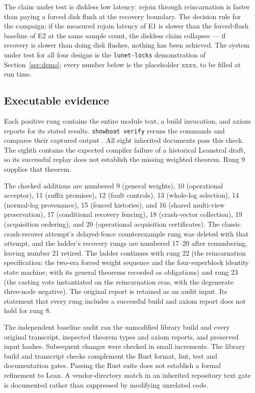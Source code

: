 \documentclass[10pt,journal,letterpaper]{IEEEtran}
\newcommand{\code}[1]{\texttt{\small #1}}
\begin{document}
The claim under test is diskless low latency: rejoin through reincarnation
is faster than paying a forced disk flush at the recovery boundary. The
decision rule for the campaign: if the measured rejoin latency of E1 is
slower than the forced-flush baseline of E2 at the same sample count, the
diskless claim collapses --- if recovery is slower than doing disk flushes,
nothing has been achieved. The system under test for all four designs is the
\code{lunet-locks} demonstration of Section~\ref{sec:demo}; every number
below is the placeholder $\mathrm{xxxx}$, to be filled at run time.

\subsection{Executable evidence}
Each positive rung contains the entire module text, a build invocation, and
axiom reports for its stated results. \code{showboat verify} reruns the
commands and compares their captured output \cite{showboat}. All eight
inherited documents pass this check. The eighth contains the expected compiler
failure of a historical Leanstral draft, so its successful replay does not
establish the missing weighted theorem. Rung 9 supplies that theorem.

The checked additions are numbered 9 (general weights), 10 (operational
acceptor), 11 (suffix promises), 12 (fault controls), 13 (whole-log
selection), 14 (normal-log provenance), 15 (fenced histories), and 16
(shared multi-view preservation), 17 (conditional recovery fencing), 18
(crash-vector collection), 19 (acquisition ordering), and 20 (operational
acquisition certificates). The classic crash-recover attempt's delayed-fence
counterexample rung was deleted with that attempt, and the ladder's recovery
rungs are numbered 17--20 after renumbering, leaving number 21 retired. The
ladder continues with rung 22 (the reincarnation specification: the two-era
forced weight sequence and the four-superblock identity state machine, with
its general theorems recorded as obligations) and rung 23 (the casting vote
instantiated on the reincarnation eras, with the degenerate three-node
negative). The original
report is retained as an audit input. Its statement that every rung includes
a successful build and axiom report does not hold for rung 8.

The independent baseline audit ran the unmodified library build and every
original transcript, inspected theorem types and axiom reports, and preserved
input hashes. Subsequent changes were checked in small increments. The
library build and transcript checks complement the Rust format, lint, test
and documentation gates. Passing the Rust suite does not establish a formal
refinement to Lean. A vendor-directory match in an inherited repository text
gate is documented rather than suppressed by modifying unrelated code.
\end{document}
